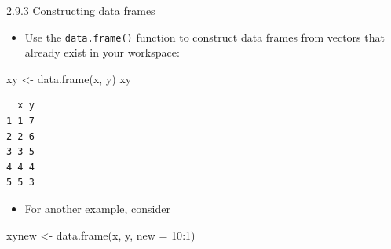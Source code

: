 \documentclass[
  9pt,
  a4paper,
  ignorenonframetext,
  notheorems]{beamer}
\newenvironment{Shaded}{\begin{snugshade}}{\end{snugshade}}
\newcommand{\AttributeTok}[1]{\textcolor[rgb]{0.40,0.45,0.13}{#1}}
\newcommand{\DecValTok}[1]{\textcolor[rgb]{0.68,0.00,0.00}{#1}}
\newcommand{\FunctionTok}[1]{\textcolor[rgb]{0.28,0.35,0.67}{#1}}
\newcommand{\NormalTok}[1]{\textcolor[rgb]{0.00,0.23,0.31}{#1}}
\newcommand{\OtherTok}[1]{\textcolor[rgb]{0.00,0.23,0.31}{#1}}
\newcommand{\SpecialCharTok}[1]{\textcolor[rgb]{0.37,0.37,0.37}{#1}}
\providecommand{\tightlist}{%
  \setlength{\itemsep}{0pt}\setlength{\parskip}{0pt}}\usepackage{longtable,booktabs,array}
\begin{document}
\begin{frame}[fragile]
\begin{block}{2.9.3 Constructing data frames}
\protect\hypertarget{constructing-data-frames}{}
\begin{itemize}
\tightlist
\item
  Use the \texttt{data.frame()} function to construct data frames from
  vectors that already exist in your workspace:
\end{itemize}

\begin{Shaded}
\begin{Highlighting}[]
\NormalTok{xy }\OtherTok{\textless{}{-}} \FunctionTok{data.frame}\NormalTok{(x, y)}
\NormalTok{xy}
\end{Highlighting}
\end{Shaded}

\begin{verbatim}
  x y
1 1 7
2 2 6
3 3 5
4 4 4
5 5 3
\end{verbatim}

\begin{itemize}
\tightlist
\item
  For another example, consider
\end{itemize}

\begin{Shaded}
\begin{Highlighting}[]
\NormalTok{xynew }\OtherTok{\textless{}{-}} \FunctionTok{data.frame}\NormalTok{(x, y, }\AttributeTok{new =} \DecValTok{10}\SpecialCharTok{:}\DecValTok{1}\NormalTok{)}
\end{Highlighting}
\end{Shaded}
\end{block}
\end{frame}
\end{document}
